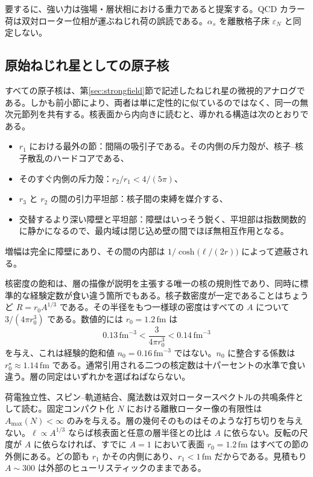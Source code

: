 \documentclass[a4paper]{article}
\begin{document}
要するに、強い力は強場・層状相における重力であると提案する。QCD カラー荷は双対ローター位相が運ぶねじれ荷の誤読である。\(\alpha_s\) を離散格子床 \(\varepsilon_N\) と同定しない。

\subsection{原始ねじれ星としての原子核}

すべての原子核は、第\ref{sec:strongfield}節で記述したねじれ星の微視的アナログである。しかも前小節により、両者は単に定性的に似ているのではなく、同一の無次元節列を共有する。核表面から内向きに読むと、導かれる構造は次のとおりである。

\begin{itemize}
\item \(r_1\) における最外の節：間隔の吸引子である。その内側の斥力殻が、核子--核子散乱のハードコアである、
\item そのすぐ内側の斥力殻：\(r_2/r_1<4/(5\pi)\)、
\item \(r_3\) と \(r_2\) の間の引力平坦部：核子間の束縛を媒介する、
\item 交替するより深い障壁と平坦部：障壁はいっそう鋭く、平坦部は指数関数的に静かになるので、最内域は閉じ込め壁の間でほぼ無相互作用となる。
\end{itemize}

増幅は完全に障壁にあり、その間の内部は \(1/\cosh\bigl(\ell/(2r)\bigr)\) によって遮蔽される。

核密度の飽和は、層の描像が説明を主張する唯一の核の規則性であり、同時に標準的な経験定数が食い違う箇所でもある。核子数密度が一定であることはちょうど \(R=r_0A^{1/3}\) である。その半径をもつ一様球の密度はすべての \(A\) について \(3/(4\pi r_0^3)\) である。数値的には \(r_0=1.2\,\mathrm{fm}\) は
\[
0.13\,\mathrm{fm}^{-3}<\frac{3}{4\pi r_0^3}<0.14\,\mathrm{fm}^{-3}
\]
を与え、これは経験的飽和値 \(n_0=0.16\,\mathrm{fm}^{-3}\) ではない。\(n_0\) に整合する係数は \(r_0^\star\approx 1.14\,\mathrm{fm}\) である。通常引用される二つの核定数は十パーセントの水準で食い違う。層の同定はいずれかを選ばねばならない。

荷電独立性、スピン--軌道結合、魔法数は双対ロータースペクトルの共鳴条件として読む。固定コンパクト化 \(N\) における離散ローター像の有限性は \(A_{\max}(N)<\infty\) のみを与える。層の幾何そのものはそのような打ち切りを与えない。\(\ell\propto A^{1/3}\) ならば核表面と任意の層半径との比は \(A\) に依らない。反転の尺度が \(A\) に依らなければ、すでに \(A=1\) において表面 \(r_0=1.2\,\mathrm{fm}\) はすべての節の外側にある。どの節も \(r_1\) かその内側にあり、\(r_1<1\,\mathrm{fm}\) だからである。見積もり \(A\sim 300\) は外部のヒューリスティックのままである。
\end{document}
